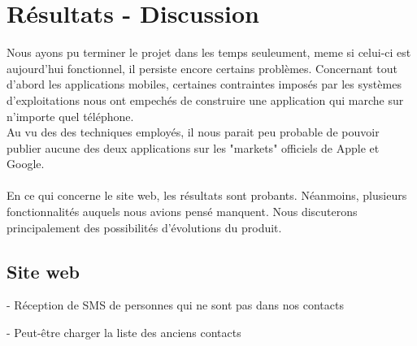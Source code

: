 \cleardoublepage



\chapter{Résultats - Discussion}

Nous ayons pu terminer le projet dans les temps seuleument, meme si celui-ci est aujourd'hui fonctionnel,
il persiste encore certains problèmes. Concernant tout d'abord les applications mobiles, certaines 
contraintes imposés par les systèmes d'exploitations nous ont empechés de construire une application 
qui marche sur n'importe quel téléphone.
\\
Au vu des des techniques employés, il nous parait peu probable de pouvoir publier aucune des
deux applications sur les "markets" officiels de Apple et Google.
\\\\

En ce qui concerne le site web, les résultats sont probants. Néanmoins, plusieurs fonctionnalités
auquels nous avions pensé manquent. Nous discuterons principalement des possibilités d'évolutions du 
produit.


\section{Site web}

- Réception de SMS de personnes qui ne sont pas dans nos contacts

- Peut-être charger la liste des anciens contacts
\\






